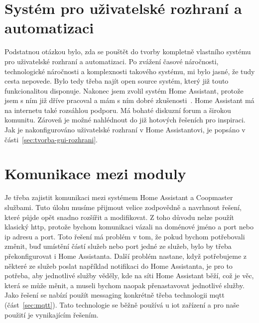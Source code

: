 \clearpage
\section{Systém pro uživatelské rozhraní a automatizaci}\label{sec:systemu-pro-uzivatelske-rozhrani-a-automatizaci}
Podstatnou otázkou bylo, zda se pouštět do tvorby kompletně vlastního systému pro uživatelské rozhraní a automatizaci.
Po zvážení časové náročnosti, technologické náročnosti a komplexnosti takového systému, mi bylo jasné, že tudy cesta nepovede.
Bylo tedy třeba najít open source systém, který již touto funkcionalitou disponuje.
Nakonec jsem zvolil systém Home Assistant, protože jsem s ním již dříve pracoval a mám s ním dobré zkušenosti~\cite{homeassistant-web}.
Home Assistant má na internetu také rozsáhlou podporu.
Má bohaté diskuzní forum a širokou komunitu.
Zároveň je možné nahlédnout do již hotových řešeních pro inspiraci.
Jak je nakonfigurováno uživatelské rozhraní v Home Assistantovi, je popsáno v části~\ref{sec:tvorba-gui-rozhrani}.

\clearpage
\section{Komunikace mezi moduly}\label{sec:komunikace-mezi-backendem-a-frontendem}
Je třeba zajistit komunikaci mezi systémem Home Assistant a Coopmaster službami.
Tuto úlohu musíme přijmout velice zodpovědně a navrhnout řešení, které půjde opět snadno rozšířit a modifikovat.
Z toho důvodu nelze použít klasický \gls{http}, protože bychom komunikaci vázali na doménové jméno a port nebo ip adresu a port.
Toto řešení má problém v tom, že pokud bychom potřebovali změnit, buď umístění částí služeb nebo port jedné ze služeb, bylo by třeba překonfigurovat i Home Assistanta.
Další problém nastane, když potřebujeme z některé ze služeb poslat například notifikaci do Home Assistanta, je pro to potřeba, aby jednotlivé služby věděly, kde na síti Home Assistant běží, což je věc, která se může měnit, a museli bychom naopak přenastavovat jednotlivé služby.
Jako řešení se nabízí použít messaging konkrétně třeba technologii \gls{mqtt} (část~\ref{sec:mqtt}).
Tato technologie se běžně používá u \gls{iot} zařízení a pro naše použití je vynikajícím řešením.

\clearpage
